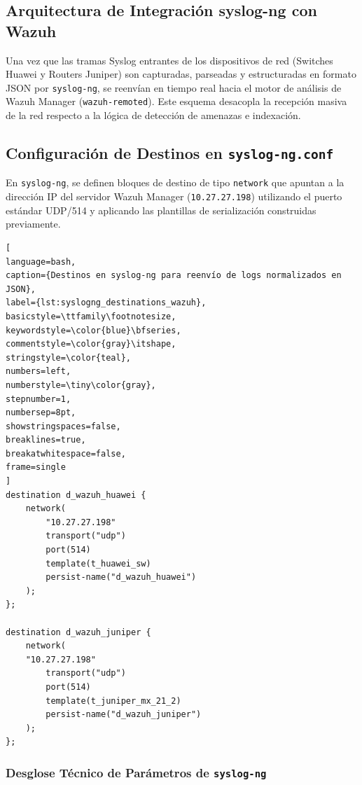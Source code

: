 \subsection{Arquitectura de Integración syslog-ng con Wazuh}
Una vez que las tramas Syslog entrantes de los dispositivos de red (Switches Huawei y Routers Juniper) son capturadas, parseadas y estructuradas en formato JSON por \texttt{syslog-ng}, se reenvían en tiempo real hacia el motor de análisis de Wazuh Manager (\texttt{wazuh-remoted}). Este esquema desacopla la recepción masiva de la red respecto a la lógica de detección de amenazas e indexación.\subsection{Configuración de Destinos en \texttt{syslog-ng.conf}}En \texttt{syslog-ng}, se definen bloques de destino de tipo \texttt{network} que apuntan a la dirección IP del servidor Wazuh Manager (\texttt{10.27.27.198}) utilizando el puerto estándar UDP/514 y aplicando las plantillas de serialización construidas previamente.\begin{lstlisting}[
language=bash,
caption={Destinos en syslog-ng para reenvío de logs normalizados en JSON},
label={lst:syslogng_destinations_wazuh},
basicstyle=\ttfamily\footnotesize,
keywordstyle=\color{blue}\bfseries,
commentstyle=\color{gray}\itshape,
stringstyle=\color{teal},
numbers=left,
numberstyle=\tiny\color{gray},
stepnumber=1,
numbersep=8pt,
showstringspaces=false,
breaklines=true,
breakatwhitespace=false,
frame=single
]
destination d_wazuh_huawei {
    network(
        "10.27.27.198"
        transport("udp")
        port(514)
        template(t_huawei_sw)
        persist-name("d_wazuh_huawei")
    );
};

destination d_wazuh_juniper {
    network(
    "10.27.27.198"
        transport("udp")
        port(514)
        template(t_juniper_mx_21_2)
        persist-name("d_wazuh_juniper")
    );
};
\end{lstlisting}

\subsubsection{Desglose Técnico de Parámetros de \texttt{syslog-ng}}

